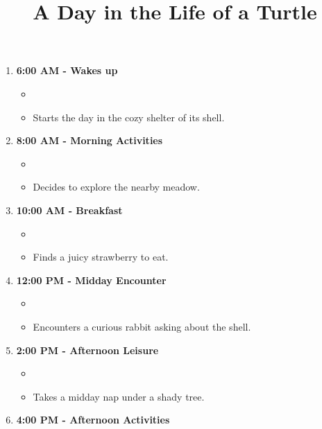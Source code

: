 \documentclass{article}
\title{A Day in the Life of a Turtle}
\date{}
\begin{document}
\maketitle

\begin{enumerate}
\item \textbf{6:00 AM - Wakes up}
\begin{itemize}
\item %
\item Starts the day in the cozy shelter of its shell.
\end{itemize}
\item \textbf{8:00 AM - Morning Activities}
\begin{itemize}
\item %
\item Decides to explore the nearby meadow.
\end{itemize}
\item \textbf{10:00 AM - Breakfast}
\begin{itemize}
\item %
\item Finds a juicy strawberry to eat.
\end{itemize}
\item \textbf{12:00 PM - Midday Encounter}
\begin{itemize}
\item %
\item Encounters a curious rabbit asking about the shell.
\end{itemize}
\item \textbf{2:00 PM - Afternoon Leisure}
\begin{itemize}
\item %
\item Takes a midday nap under a shady tree.
\end{itemize}
\item \textbf{4:00 PM - Afternoon Activities}

\end{enumerate}
\end{document}
